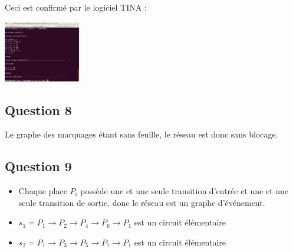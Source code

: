 Ceci est confirmé par le logiciel TINA :
\begin{center}
  \includegraphics[width=0.25\textwidth]{images/pflot_pochoir.png}
\end{center}

\subsection{Question 8}

Le graphe des marquages étant sans feuille, le réseau est donc sans blocage.

\subsection{Question 9}

\begin{itemize}
  \item Chaque place $P_i$ possède une et une seule transition d'entrée et une et une seule transition de sortie, donc le réseau est un graphe d'événement.
  \item $s_1 = P_1 \rightarrow P_2 \rightarrow P_4 \rightarrow P_6 \rightarrow P_1$ est un circuit élémentaire
  \item $s_2 = P_1 \rightarrow P_3 \rightarrow P_5 \rightarrow P_7 \rightarrow P_1$ est un circuit élémentaire
\end{itemize}

\newpage
